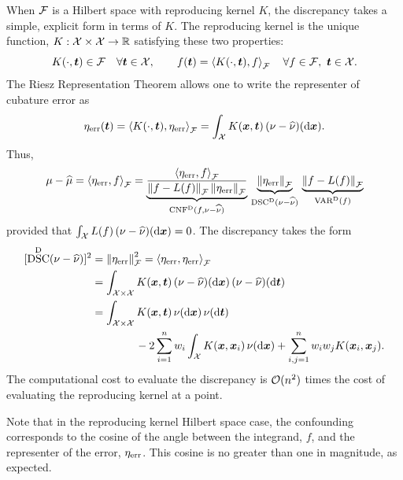 \documentclass[graybox,footinfo]{svmult}
\DeclareMathOperator{\algn}{CNF}
\DeclareMathOperator{\disc}{DSC}
\DeclareMathOperator{\Var}{VAR}
\begin{document}
When $\cf$ is a Hilbert space with reproducing kernel $K$, the discrepancy takes a 
simple, explicit form in terms of $K$.  The reproducing kernel is the unique function, $K: 
\cx \times \cx \to \R$ satisfying these two properties:
\begin{equation}
K(\cdot,\bst) \in \cf \quad \forall \bst \in \cx, \qquad f(\bst) = \ip[\cf]{K(\cdot,\bst)}{f} 
\quad \forall f \in \cf, \ \bst \in \cx.
\end{equation}
The Riesz Representation Theorem allows one to write the representer of cubature error 
as 
\begin{equation}
\eta_{\err}(\bst) = \ip[\cf]{K(\cdot,\bst)}{\eta_{\err}} = \int_{\cx} K(\bsx,\bst) \, (\nu - 
\hnu)(\D\bsx).
\end{equation}
Thus, 
\begin{equation}
\mu - \widehat{\mu} =  \ip[\cf]{\eta_{\err}}{f} = 
\underbrace{\frac{\ip[\cf]{\eta_{\err}}{f}}{\norm{f - 
L(f)}_{\cf} \norm{\eta_{\err}}_{\cf}} }_{\algn^\Dt(f,\nu - \hnu)}\, 
\underbrace{\norm{\eta_{\err}}_{\cf}}_{\disc^{\Dt}(\nu - \hnu)} \, 
\underbrace{\norm{f - L(f)}_{\cf}}_{\Var^\Dt(f)}
\end{equation}
provided that $\int_{\cx} L(f) \, (\nu - \hnu)(\D \bsx) = 0$.  The discrepancy  takes the 
form \cite{Hic99a}
\begin{align}
\nonumber
[\disc^{\Dt}(\nu - \hnu)]^2 & = \norm{\eta_{\err}}_{\cf}^2 = \ip[\cf]{\eta_{\err}}{\eta_{\err}} 
\\
\nonumber
& = \int_{\cx \times \cx} K(\bsx,\bst) \, (\nu - \hnu)(\D \bsx) \, (\nu - \hnu)(\D \bst) \\
\nonumber
& = \int_{\cx \times \cx} K(\bsx,\bst) \, \nu(\D \bsx) \, \nu (\D \bst)  \\
& \qquad \qquad - 2 \sum_{i=1}^n w_i 
\int_{\cx} K(\bsx,\bsx_i) \, \nu(\D \bsx)+ \sum_{i,j = 1}^n w_iw_jK(\bsx_i,\bsx_j).
\end{align}
The computational cost to evaluate the discrepancy is $\Order(n^2)$ times the cost of 
evaluating the reproducing kernel at a point. 

Note that in the reproducing kernel Hilbert space case, the confounding corresponds to 
the cosine of the angle between the integrand, $f$, and the representer of the error, 
$\eta_{\err}$.  This cosine is no greater than one in magnitude, as expected.
\end{document}
